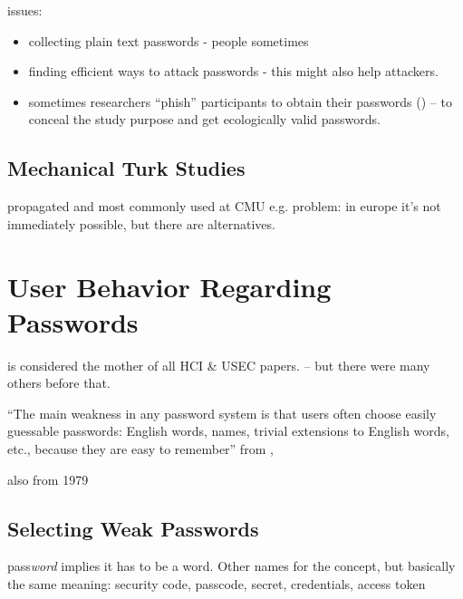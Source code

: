 	issues:
	\begin{itemize}
		\item collecting plain text passwords - people sometimes
		\item finding efficient ways to attack passwords - this might also help attackers. 
		\item sometimes researchers ``phish'' participants to obtain their passwords (\cite{Egelman2013DoesMyPasswordGoUpToEleven, Haque2014Hierarchy, Mazurek2013Measuring}) -- to conceal the study purpose and get ecologically valid passwords. 
	\end{itemize}
	

	\subsection{Mechanical Turk Studies}
	
	propagated and most commonly used at CMU e.g. \cite{Mazurek2013Measuring} \cite{Shay2014CanLongPasswordsBeSecureAndUsable} \cite{Shay2016DesigningPasswordPolicies}
	\cite{Shay2015UsablePoliciesMTurk}
	\cite{Ur2016PerceptionsPassword} \cite{Melicher2016UsabilityMobileTextPasswords} \cite{Ur2017DataDrivenPWMeter}
	problem: in europe it's not immediately possible, but there are alternatives. 



	
\section{User Behavior Regarding Passwords}
\label{sec:rw:how-users-cope}


\cite{Adams1999UsersEnemy} is considered the mother of all HCI \& USEC papers. -- but there were many others before that.

``The main weakness in any password system is that users often choose easily guessable passwords: English words, names, trivial extensions to English words, etc., because they are easy to remember'' from \cite{Feldmeier1990UnixPasswordSecurity},

also \cite{Morris1979PasswordSecurity} from 1979


	\subsection{Selecting Weak Passwords}

	pass\textit{word} implies it has to be a word. Other names for the concept, but basically the same meaning: security code, passcode, secret, credentials, access token
	

